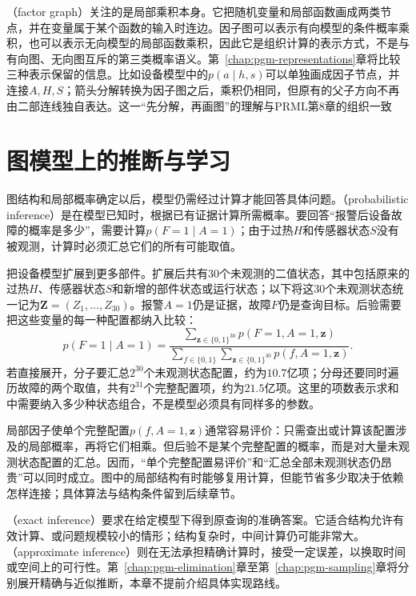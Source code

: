 （factor graph）关注的是局部乘积本身。它把随机变量和局部函数画成两类节点，并在变量属于某个函数的输入时连边。因子图可以表示有向模型的条件概率乘积，也可以表示无向模型的局部函数乘积，因此它是组织计算的表示方式，不是与有向图、无向图互斥的第三类概率语义。第~\ref{chap:pgm-representations}章将比较三种表示保留的信息。比如设备模型中的$p(a\mid h,s)$可以单独画成因子节点，并连接$A,H,S$；箭头分解转换为因子图之后，乘积仍相同，但原有的父子方向不再由二部连线独自表达。这一“先分解，再画图”的理解与PRML第8章的组织一致

\section{图模型上的推断与学习}
\label{sec:pgm-overview-inference-learning}

图结构和局部概率确定以后，模型仍需经过计算才能回答具体问题。（probabilistic inference）是在模型已知时，根据已有证据计算所需概率。要回答“报警后设备故障的概率是多少”，需要计算$p(F=1\mid A=1)$；由于过热$H$和传感器状态$S$没有被观测，计算时必须汇总它们的所有可能取值。

把设备模型扩展到更多部件。扩展后共有$30$个未观测的二值状态，其中包括原来的过热$H$、传感器状态$S$和新增的部件状态或运行状态；以下将这$30$个未观测状态统一记为$\bm{Z}=(Z_1,\ldots,Z_{30})$。报警$A=1$仍是证据，故障$F$仍是查询目标。后验需要把这些变量的每一种配置都纳入比较：
\begin{equation}
  p(F=1\mid A=1)
  =
  \frac{
    \displaystyle\sum_{\bm{z}\in\{0,1\}^{30}}
    p(F=1,A=1,\bm{z})
  }{
    \displaystyle\sum_{f\in\{0,1\}}
    \sum_{\bm{z}\in\{0,1\}^{30}}
    p(f,A=1,\bm{z})
  }.
  \label{eq:pgm-overview-expanded-diagnosis}
\end{equation}
若直接展开，分子要汇总$2^{30}$个未观测状态配置，约为$10.7$亿项；分母还要同时遍历故障的两个取值，共有$2^{31}$个完整配置项，约为$21.5$亿项。这里的项数表示求和中需要纳入多少种状态组合，不是模型必须具有同样多的参数。

局部因子使单个完整配置$p(f,A=1,\bm{z})$通常容易评价：只需查出或计算该配置涉及的局部概率，再将它们相乘。但后验不是某个完整配置的概率，而是对大量未观测状态配置的汇总。因而，“单个完整配置易评价”和“汇总全部未观测状态仍昂贵”可以同时成立。图中的局部结构有时能够复用计算，但能节省多少取决于依赖怎样连接；具体算法与结构条件留到后续章节。

（exact inference）要求在给定模型下得到原查询的准确答案。它适合结构允许有效计算、或问题规模较小的情形；结构复杂时，中间计算仍可能非常大。（approximate inference）则在无法承担精确计算时，接受一定误差，以换取时间或空间上的可行性。第~\ref{chap:pgm-elimination}章至第~\ref{chap:pgm-sampling}章将分别展开精确与近似推断，本章不提前介绍具体实现路线。


